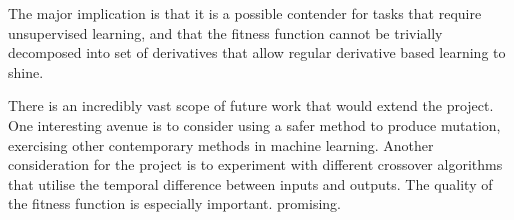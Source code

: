 \documentclass[12pt,a4paper]{article}
\begin{document}
    The major implication is that it is a possible contender for tasks that require unsupervised learning, and that the fitness function cannot be trivially decomposed into set of derivatives that allow regular derivative based learning to shine.
    
    
    There is an incredibly vast scope of future work that would extend the project. One interesting avenue is to consider using a safer method to produce mutation, exercising other contemporary methods in machine learning. 
    Another consideration for the project is to experiment with different crossover algorithms that utilise the temporal difference between inputs and outputs. 
    The quality of the fitness function is especially important.
    promising.


    

\end{document}
